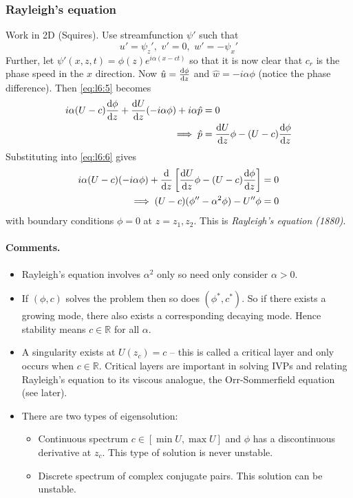 \documentclass{jknotes}
\begin{document}
\subsubsection{Rayleigh's equation}
Work in 2D (Squires). Use streamfunction $\psi'$ such that
\begin{equation}
	u' = \psi_z', \,\,v' = 0, \,\,w' = -\psi_x'
\end{equation}
Further, let $\psi'(x,z,t) = \phi(z)e^{i\alpha(x-ct)}$ so that it is  now
clear that $c_r$ is the phase speed in the $x$ direction. Now $\hat{u} =
\frac{\diffd \phi}{\diffd z}$ and $\hat{w} = -i\alpha \phi$ (notice the phase
difference). Then \eqref{eq:l6:5} becomes
\begin{align}
	i\alpha(U-c)\frac{\diffd \phi}{\diffd z} + \frac{\diffd U}{\diffd
	z}(-i\alpha \phi) + i\alpha \hat{p} &= 0\\
	\implies \hat{p}&= \frac{\diffd U}{\diffd z}\phi - (U-c)\frac{\diffd
	\phi}{\diffd z}
\end{align}
Substituting into \eqref{eq:l6:6} gives
\begin{align}
	i\alpha (U-c)(-i\alpha \phi) + \frac{\diffd}{\diffd z}\left[ \frac{\diffd
	U}{\diffd z}\phi - (U-c)\frac{\diffd \phi}{\diffd z}\right] &= 0 \\
	\implies (U-c)(\phi'' - \alpha^2 \phi) - U'' \phi &=0
\end{align}
with boundary conditions $\phi = 0$ at $z=z_1, z_2$. This is \emph{Rayleigh's
equation (1880)}.
\paragraph{Comments.}
\begin{itemize}
	\item Rayleigh's equation involves $\alpha^2$ only so need only consider
		$\alpha > 0$.
	\item If $(\phi,c)$ solves the problem then so does $(\phi^*, c^*)$. So if
		there exists a growing mode, there  also exists a corresponding
		decaying mode. Hence stability means $c \in \mathbb{R}$ for all
		$\alpha$.
	\item A singularity  exists at $U(z_c) = c$ -- this is called a critical
		layer and only occurs when $c \in \mathbb{R}$. Critical layers are
		important in solving IVPs and relating Rayleigh's equation to its
		viscous analogue, the Orr-Sommerfield equation (see later).
	\item There are two types of eigensolution:
		\begin{itemize}
			\item Continuous  spectrum $c \in \left[ \min U, \max
				U\right]$ and $\phi$ has a discontinuous derivative at $z_c$.
				This type of solution is never unstable.
			\item Discrete spectrum of complex conjugate pairs. This solution
				can be unstable.
		\end{itemize}
\end{itemize}
\end{document}
